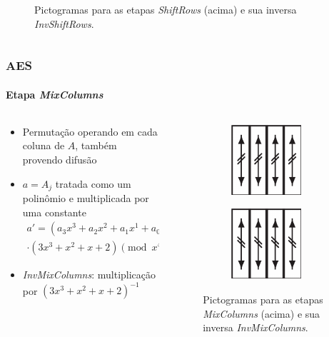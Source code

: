 \documentclass[12pt]{beamer}
\begin{document}
\begin{frame}
\begin{columns}[T]
\begin{column}{.25\textwidth}
\begin{figure}
        \captionsetup{font=scriptsize}
        \caption*{Pictogramas para as etapas \emph{ShiftRows} (acima) e sua
          inversa \emph{InvShiftRows}.}
      \end{figure}
    \end{column}
  \end{columns}
\end{frame}

\begin{frame}
  \frametitle{AES}
  \framesubtitle{Etapa \emph{MixColumns}}
  \begin{columns}[T]
    \begin{column}{.7\textwidth}
      \begin{itemize}
        \item Permutação operando em cada coluna de $A$, também provendo
            difusão
        \item $a = A_j$ tratada como um polinômio e multiplicada por uma
            constante
        \begin{multline*}
          a' = (a_3 x^3 + a_2 x^2 + a_1 x^1 + a_0 x^0) \\
          \cdot (3 x^3 + x^2 + x + 2) \pmod{x^4 + 1}
        \end{multline*}
        \item \emph{InvMixColumns}: multiplicação por ${(3 x^3 + x^2 + x +
            2)}^{-1}$
      \end{itemize}
    \end{column}
    \begin{column}{.25\textwidth}
      \begin{figure}
        \centering
        \begin{subfigure}[b]{0.7\textwidth}
          \includegraphics{img/mix_columns_fwd.pdf}
          \vspace{2mm}
        \end{subfigure}

        \begin{subfigure}[b]{0.7\textwidth}
          \includegraphics{img/mix_columns_inv.pdf}
        \end{subfigure}

        \captionsetup{font=scriptsize}
        \caption*{Pictogramas para as etapas \emph{MixColumns} (acima) e sua
          inversa \emph{InvMixColumns}.}
      \end{figure}
    \end{column}
  \end{columns}
\end{frame}
\end{document}
